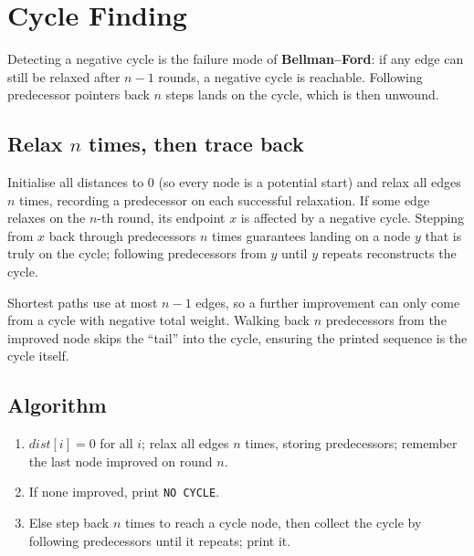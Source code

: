 \section{Cycle Finding}
\label{sec:cses-cycle-finding}


\begin{patternbox}
Detecting a negative cycle is the failure mode of \textbf{Bellman--Ford}:
if any edge can still be relaxed after $n-1$ rounds, a negative cycle is
reachable. Following predecessor pointers back $n$ steps lands on the cycle,
which is then unwound.
\end{patternbox}

\subsection*{Relax $n$ times, then trace back}

Initialise all distances to $0$ (so every node is a potential start) and
relax all edges $n$ times, recording a predecessor on each successful
relaxation. If some edge relaxes on the $n$-th round, its endpoint $x$ is
affected by a negative cycle. Stepping from $x$ back through predecessors
$n$ times guarantees landing on a node $y$ that is truly on the cycle;
following predecessors from $y$ until $y$ repeats reconstructs the cycle.

\begin{ideabox}
Shortest paths use at most $n-1$ edges, so a further improvement can only
come from a cycle with negative total weight. Walking back $n$ predecessors
from the improved node skips the ``tail'' into the cycle, ensuring the
printed sequence is the cycle itself.
\end{ideabox}

\subsection*{Algorithm}

\begin{enumerate}
  \item $\textit{dist}[i]=0$ for all $i$; relax all edges $n$ times,
        storing predecessors; remember the last node improved on round
        $n$.
  \item If none improved, print \texttt{NO CYCLE}.
  \item Else step back $n$ times to reach a cycle node, then collect the
        cycle by following predecessors until it repeats; print it.
\end{enumerate}

